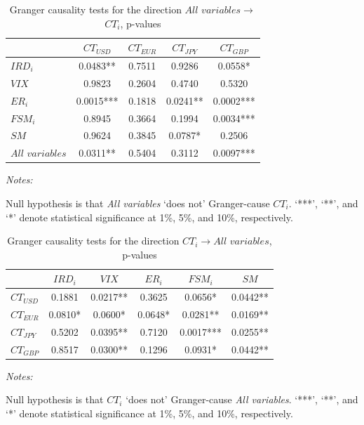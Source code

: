 \documentclass[a4paper, twoside]{templates/ociamthesis}
\begin{document}
\begin{table}[!ht]

\caption{\label{tab:Table445}Granger causality tests for the direction $\textit{All variables}$$\rightarrow$$CT_{i}$, p-values}
\centering
\begin{threeparttable}
\begin{tabular}[t]{lcccc}
\toprule
 & $CT_{USD}$ & $CT_{EUR}$ & $CT_{JPY}$ & $CT_{GBP}$\\
\midrule
$IRD_{i}$ & 0.0483** & 0.7511 & 0.9286 & 0.0558*\\
$VIX$ & 0.9823 & 0.2604 & 0.4740 & 0.5320\\
$ER_{i}$ & 0.0015*** & 0.1818 & 0.0241** & 0.0002***\\
$FSM_{i}$ & 0.8945 & 0.3664 & 0.1994 & 0.0034***\\
$SM$ & 0.9624 & 0.3845 & 0.0787* & 0.2506\\
$All$ $variables$ & 0.0311** & 0.5404 & 0.3112 & 0.0097***\\
\bottomrule
\end{tabular}
\begin{tablenotes}[para]
\item \textit{\scriptsize{Notes: }} 
\item \scriptsize{Null hypothesis is that \textit{All variables} ‘does not’ Granger-cause $CT_{i}$. ‘***’, ‘**’, and ‘*’ denote statistical significance at 1\%, 5\%, and 10\%, respectively.} 
\end{tablenotes}
\end{threeparttable}
\end{table}

\begin{table}[!ht]

\caption{\label{tab:Table444}Granger causality tests for the direction $CT_{i}$$\rightarrow$$\textit{All variables}$, p-values}
\centering
\begin{threeparttable}
\begin{tabular}[t]{lccccc}
\toprule
 & $IRD_{i}$ & $VIX$ & $ER_{i}$ & $FSM_{i}$ & $SM$\\
\midrule
$CT_{USD}$ & 0.1881 & 0.0217** & 0.3625 & 0.0656* & 0.0442**\\
$CT_{EUR}$ & 0.0810* & 0.0600* & 0.0648* & 0.0281** & 0.0169**\\
$CT_{JPY}$ & 0.5202 & 0.0395** & 0.7120 & 0.0017*** & 0.0255**\\
$CT_{GBP}$ & 0.8517 & 0.0300** & 0.1296 & 0.0931* & 0.0442**\\
\bottomrule
\end{tabular}
\begin{tablenotes}[para]
\item \textit{\scriptsize{Notes: }} 
\item \scriptsize{Null hypothesis is that $CT_{i}$ ‘does not’ Granger-cause \textit{All variables}. ‘***’, ‘**’, and ‘*’ denote statistical significance at 1\%, 5\%, and 10\%, respectively.} 
\end{tablenotes}
\end{threeparttable}
\end{table}
\end{document}
